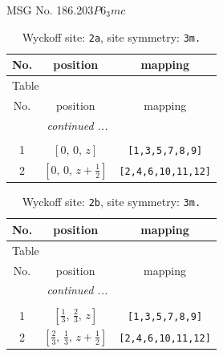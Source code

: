 \documentclass[fleqn,8pt]{jsarticle}
\begin{document}
\setcounter{MaxMatrixCols}{32}

\renewcommand{\tablename}{Table~}
\renewcommand{\figurename}{Figure~}
\begin{center}
\LARGE
MSG No. 186.203\quad$P6_{3}mc$
\end{center}
\renewcommand{\arraystretch}{1.2}
\begin{longtable}{ccc}
\caption{Wyckoff site: {\tt 2a}, site symmetry: {\tt 3m.}}
 \\
 \hline \hline
No. & position & mapping \\ \hline \endfirsthead

\multicolumn{2}{l}{\tablename\ \thetable{}} \\
 \hline \hline
No. & position & mapping \\ \hline \endhead

 \hline \hline
\multicolumn{2}{r}{\footnotesize\it continued ...} \\ \endfoot

 \hline \hline
\multicolumn{2}{r}{} \\ \endlastfoot

1 & $\left[ 0,\, 0,\, z \right]$ & {\tt [1,3,5,7,8,9]} \\ \hline
2 & $\left[ 0,\, 0,\, z + \frac{1}{2} \right]$ & {\tt [2,4,6,10,11,12]} \\
\end{longtable}
\renewcommand{\arraystretch}{1.2}
\begin{longtable}{ccc}
\caption{Wyckoff site: {\tt 2b}, site symmetry: {\tt 3m.}}
 \\
 \hline \hline
No. & position & mapping \\ \hline \endfirsthead

\multicolumn{2}{l}{\tablename\ \thetable{}} \\
 \hline \hline
No. & position & mapping \\ \hline \endhead

 \hline \hline
\multicolumn{2}{r}{\footnotesize\it continued ...} \\ \endfoot

 \hline \hline
\multicolumn{2}{r}{} \\ \endlastfoot

1 & $\left[ \frac{1}{3},\, \frac{2}{3},\, z \right]$ & {\tt [1,3,5,7,8,9]} \\ \hline
2 & $\left[ \frac{2}{3},\, \frac{1}{3},\, z + \frac{1}{2} \right]$ & {\tt [2,4,6,10,11,12]} \\
\end{longtable}
\end{document}
